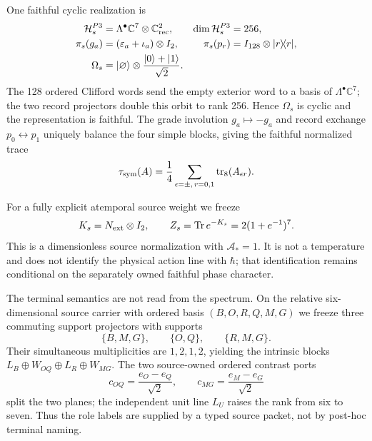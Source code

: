 \documentclass[11pt,a4paper]{article}
\theoremstyle{remark}
\newcommand{\Hseed}{\mathcal H_s}
\newcommand{\Tr}{\operatorname{Tr}}
\begin{document}
One faithful cyclic realization is
\begin{align}
 \Hseed^{P3}&=\Lambda^\bullet\mathbb C^7\otimes\mathbb C^2_{\rm rec},
 &\dim\Hseed^{P3}&=256,\label{eq:p3hilbert}\\
 \pi_s(g_a)&=(\varepsilon_a+\iota_a)\otimes I_2,
 &\pi_s(p_r)&=I_{128}\otimes|r\rangle\!\langle r|,\label{eq:p3rep}\\
 \Omega_s&=|\varnothing\rangle\otimes
 \frac{|0\rangle+|1\rangle}{\sqrt2}.
 \label{eq:p3root}
\end{align}
The 128 ordered Clifford words send the empty exterior word to a basis of
$\Lambda^\bullet\mathbb C^7$; the two record projectors double this orbit to
rank 256.  Hence $\Omega_s$ is cyclic and the representation is faithful.
The grade involution $g_a\mapsto-g_a$ and record exchange
$p_0\leftrightarrow p_1$ uniquely balance the four simple blocks, giving the
faithful normalized trace
\begin{equation}
 \tau_{\rm sym}(A)=\frac{1}{4}\sum_{\epsilon=\pm,\,r=0,1}
 \operatorname{tr}_8(A_{\epsilon r}).
 \label{eq:p3trace}
\end{equation}

For a fully explicit atemporal source weight we freeze
\begin{equation}
 K_s=N_{\rm ext}\otimes I_2,
 \qquad
 Z_s=\Tr e^{-K_s}=2(1+e^{-1})^7.
 \label{eq:p3hodge}
\end{equation}
This is a dimensionless source normalization with $\mathcal A_*=1$.  It is
not a temperature and does not identify the physical action line with
$\hbar$; that identification remains conditional on the separately owned
faithful phase character.

The terminal semantics are not read from the spectrum.  On the relative
six-dimensional source carrier with ordered basis $(B,O,R,Q,M,G)$ we freeze
three commuting support projectors with supports
\begin{equation}
 \{B,M,G\},\qquad\{O,Q\},\qquad\{R,M,G\}.
 \label{eq:p3flag}
\end{equation}
Their simultaneous multiplicities are $1,2,1,2$, yielding the intrinsic
blocks $L_B\oplus W_{OQ}\oplus L_R\oplus W_{MG}$.  The two source-owned
ordered contrast ports
\begin{equation}
 c_{OQ}=\frac{e_O-e_Q}{\sqrt2},
 \qquad
 c_{MG}=\frac{e_M-e_G}{\sqrt2}
 \label{eq:p3ports}
\end{equation}
split the two planes; the independent unit line $L_U$ raises the rank from six
to seven.  Thus the role labels are supplied by a typed source packet, not by
post-hoc terminal naming.
\end{document}

